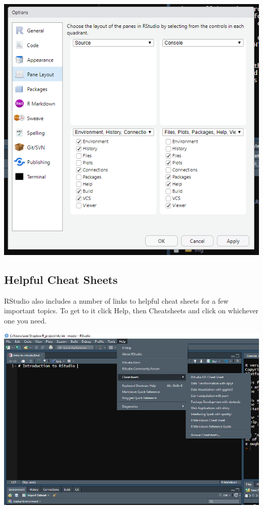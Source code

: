 \documentclass[
  12pt,
]{book}
\begin{document}
\includegraphics{images/rstudio_9.PNG}

\hypertarget{helpful-cheat-sheets}{%
\subsection{Helpful Cheat Sheets}\label{helpful-cheat-sheets}}

RStudio also includes a number of links to helpful cheat sheets for a few important topics. To get to it click Help, then Cheatsheets and click on whichever one you need.

\includegraphics{images/rstudio_4.PNG}
\end{document}
